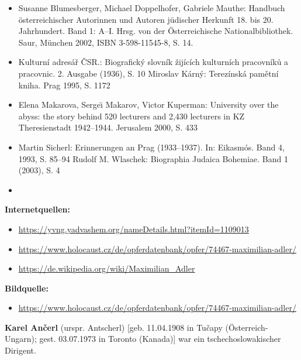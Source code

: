 \documentclass[a4paper]{article}
\begin{document}
\begin{itemize}
\item Susanne Blumesberger, Michael Doppelhofer, Gabriele Mauthe: Handbuch österreichischer Autorinnen und Autoren
jüdischer Herkunft 18. bis 20. Jahrhundert. Band 1: A–I. Hrsg. von der Österreichische Nationalbibliothek. Saur,
München 2002, ISBN 3-598-11545-8, S. 14.
\item Kulturní adresář ČSR.: Biografický slovník žijících kulturních pracovníků a pracovnic. 2. Ausgabe (1936), S. 10 
Miroslav Kárný: Terezínská pamětní kniha. Prag 1995, S. 1172  
\item Elena Makarova, Serge\u{\i} Makarov, Victor Kuperman: University over the abyss: the story behind 520 lecturers
and 2,430 lecturers in KZ Theresienstadt 1942–1944. Jerusalem 2000, S. 433  
\item Martin Sicherl: Erinnerungen an Prag (1933–1937). In: Eikasmós. Band 4, 1993, S. 85–94  Rudolf M. Wlaschek:
Biographia Judaica Bohemiae. Band 1 (2003), S. 4
\item 
\bigskip
\end{itemize}
\textbf{Internetquellen:}

\begin{itemize}
\item \url{https://yvng.yadvashem.org/nameDetails.html?itemId=1109013}
\item \url{https://www.holocaust.cz/de/opferdatenbank/opfer/74467-maximilian-adler/}
\item \url{https://de.wikipedia.org/wiki/Maximilian_Adler} 
\end{itemize}

\bigskip

\textbf{Bildquelle:}

\begin{itemize}
\item \url{https://www.holocaust.cz/de/opferdatenbank/opfer/74467-maximilian-adler/}
\end{itemize}
\textbf{Karel Ančerl} (urspr. Antscherl) [geb. 11.04.1908 in Tučapy (Österreich-Ungarn); gest. 03.07.1973 in Toronto
(Kanada)] war ein tschechoslowakischer Dirigent.
\end{document}
